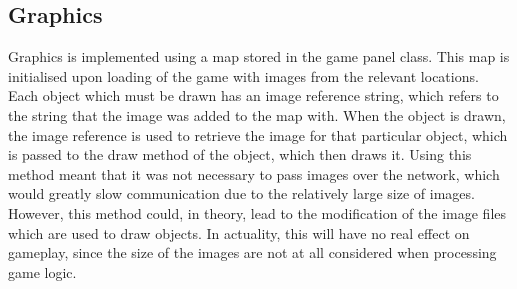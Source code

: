 \subsection{Graphics}
Graphics is implemented using a map stored in the game panel class. This map is initialised upon loading of the game with images from the relevant locations. Each object which must be drawn has an image reference string, which refers to the string that the image was added to the map with. When the object is drawn, the image reference is used to retrieve the image for that particular object, which is passed to the draw method of the object, which then draws it. Using this method meant that it was not necessary to pass images over the network, which would greatly slow communication due to the relatively large size of images. However, this method could, in theory, lead to the modification of the image files which are used to draw objects. In actuality, this will have no real effect on gameplay, since the size of the images are not at all considered when processing game logic.


